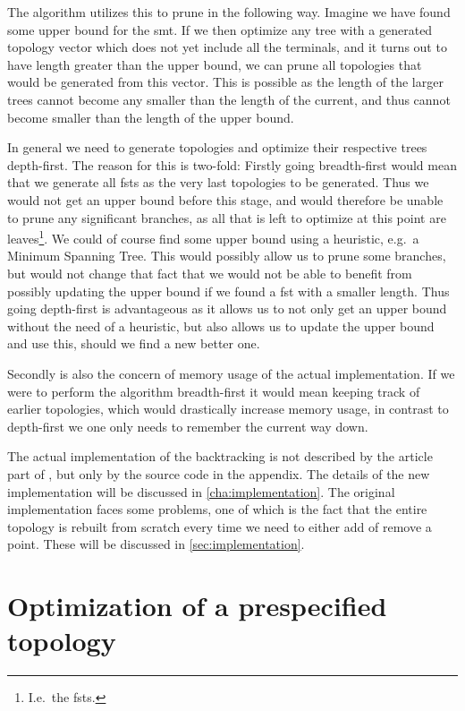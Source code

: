 The algorithm utilizes this to prune in the following way. Imagine we have found
some upper bound for the \ac{smt}. If we then optimize any tree with a generated
topology vector which does not yet include all the terminals, and it turns out
to have length greater than the upper bound, we can prune all topologies that
would be generated from this vector. This is possible as the length of the
larger trees cannot become any smaller than the length of the current, and thus
cannot become smaller than the length of the upper bound.

In general we need to generate topologies and optimize their respective trees
depth-first. The reason for this is two-fold: Firstly going breadth-first would
mean that we generate all \acp{fst} as the very last topologies to be
generated. Thus we would not get an upper bound before this stage, and would
therefore be unable to prune any significant branches, as all that is left to
optimize at this point are leaves\footnote{I.e.\ the \acp{fst}.}. We could of
course find some upper bound using a heuristic, e.g.\ a Minimum Spanning
Tree. This would possibly allow us to prune some branches, but would not change
that fact that we would not be able to benefit from possibly updating the upper
bound if we found a \ac{fst} with a smaller length. Thus going depth-first is
advantageous as it allows us to not only get an upper bound without the need of
a heuristic, but also allows us to update the upper bound and use this, should
we find a new better one.

Secondly is also the concern of memory usage of the actual implementation. If we
were to perform the algorithm breadth-first it would mean keeping track of
earlier topologies, which would drastically increase memory usage, in contrast
to depth-first we one only needs to remember the current way down.

The actual implementation of the backtracking is not described by the article
part of \textcite{smith1992}, but only by the source code in the appendix. The
details of the new implementation will be discussed in
\cref{cha:implementation}. The original implementation faces some problems,
one of which is the fact that the entire topology is rebuilt from scratch every
time we need to either add of remove a point. These will be discussed in
\cref{sec:implementation}.

\section{Optimization of a prespecified topology}
\label{sec:optim-presp-topol}

